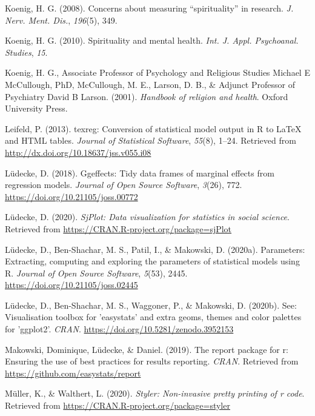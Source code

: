 \documentclass[
  english,
  man,floatsintext]{apa6}
\begin{document}
\leavevmode\hypertarget{ref-Koenig2008-lv}{}%
Koenig, H. G. (2008). Concerns about measuring ``spirituality'' in research. \emph{J. Nerv. Ment. Dis.}, \emph{196}(5), 349.

\leavevmode\hypertarget{ref-Koenig2010-gk}{}%
Koenig, H. G. (2010). Spirituality and mental health. \emph{Int. J. Appl. Psychoanal. Studies}, \emph{15}.

\leavevmode\hypertarget{ref-Koenig2001-ow}{}%
Koenig, H. G., Associate Professor of Psychology and Religious Studies Michael E McCullough, PhD, McCullough, M. E., Larson, D. B., \& Adjunct Professor of Psychiatry David B Larson. (2001). \emph{Handbook of religion and health}. Oxford University Press.

\leavevmode\hypertarget{ref-R-texreg}{}%
Leifeld, P. (2013). texreg: Conversion of statistical model output in R to LaTeX and HTML tables. \emph{Journal of Statistical Software}, \emph{55}(8), 1--24. Retrieved from \url{http://dx.doi.org/10.18637/jss.v055.i08}

\leavevmode\hypertarget{ref-R-ggeffects}{}%
Lüdecke, D. (2018). Ggeffects: Tidy data frames of marginal effects from regression models. \emph{Journal of Open Source Software}, \emph{3}(26), 772. \url{https://doi.org/10.21105/joss.00772}

\leavevmode\hypertarget{ref-R-sjPlot}{}%
Lüdecke, D. (2020). \emph{SjPlot: Data visualization for statistics in social science}. Retrieved from \url{https://CRAN.R-project.org/package=sjPlot}

\leavevmode\hypertarget{ref-R-parameters}{}%
Lüdecke, D., Ben-Shachar, M. S., Patil, I., \& Makowski, D. (2020a). Parameters: Extracting, computing and exploring the parameters of statistical models using R. \emph{Journal of Open Source Software}, \emph{5}(53), 2445. \url{https://doi.org/10.21105/joss.02445}

\leavevmode\hypertarget{ref-R-see}{}%
Lüdecke, D., Ben-Shachar, M. S., Waggoner, P., \& Makowski, D. (2020b). See: Visualisation toolbox for 'easystats' and extra geoms, themes and color palettes for 'ggplot2'. \emph{CRAN}. \url{https://doi.org/10.5281/zenodo.3952153}

\leavevmode\hypertarget{ref-R-report}{}%
Makowski, Dominique, Lüdecke, \& Daniel. (2019). The report package for r: Ensuring the use of best practices for results reporting. \emph{CRAN}. Retrieved from \url{https://github.com/easystats/report}

\leavevmode\hypertarget{ref-R-styler}{}%
Müller, K., \& Walthert, L. (2020). \emph{Styler: Non-invasive pretty printing of r code}. Retrieved from \url{https://CRAN.R-project.org/package=styler}
\end{document}
